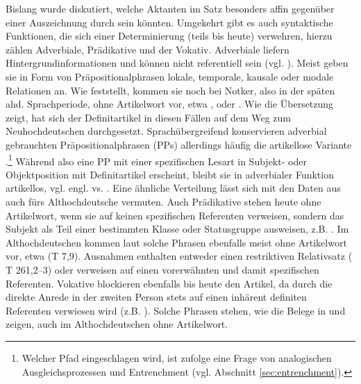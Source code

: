 Bislang wurde diskutiert, welche Aktanten im Satz besonders affin gegenüber einer Auszeichnung durch  sein könnten. Umgekehrt gibt es auch syntaktische Funktionen, die sich einer Determinierung (teils bis heute) verwehren, hierzu zählen Adverbiale, Prädikative und der Vokativ. Adverbiale liefern Hintergrundinformationen und können nicht referentiell sein (vgl. ). Meist geben sie in Form von Präpositionalphrasen lokale, temporale, kausale oder modale Relationen an. Wie \textcite[84]{Oubouzar1992} feststellt, kommen sie noch bei Notker, also in der späten ahd. Sprachperiode, ohne Artikelwort vor, etwa  ,   oder   \parencite[vgl. auch][76]{Szczepaniak2011a}. Wie die Übersetzung zeigt, hat sich der Definitartikel in diesen Fällen auf dem Weg zum Neuhochdeutschen durchgesetzt. Sprachübergreifend konservieren adverbial gebrauchten Präpositionalphrasen (PPs) allerdings häufig die artikellose Variante \parencite{Himmelmann1998}.\footnote{Welcher Pfad eingeschlagen wird, ist \textcite[342 und 344f.]{Himmelmann1998} zufolge eine Frage von analogischen Ausgleichsprozessen und Entrenchment (vgl. Abschnitt \ref{sec:entrenchment}).} Während also eine PP mit einer spezifischen Lesart in Subjekt- oder Objektposition mit Definitartikel erscheint, bleibt sie in adverbialer Funktion artikellos, vgl. engl.  vs.  \parencite[332]{Himmelmann1998}. Eine ähnliche Verteilung lässt sich mit den Daten aus \textcite[84f.]{Oubouzar1992} auch fürs Althochdeutsche vermuten. Auch Prädikative stehen heute ohne Artikelwort, wenn sie auf keinen spezifischen Referenten verweisen, sondern das Subjekt als Teil einer bestimmten Klasse oder Statusgruppe ausweisen, z.B.  \parencite[vgl.][218]{DAvis2013}. Im Althochdeutschen kommen laut \textcite[6--8]{Graf1905} solche Phrasen ebenfalls meist ohne Artikelwort vor, etwa  (T 7,9). Ausnahmen enthalten entweder einen restriktiven Relativsatz ( T 261,2--3) oder verweisen auf einen  vorerwähnten und damit spezifischen Referenten. Vokative blockieren ebenfalls bis heute den Artikel, da durch die direkte Anrede in der zweiten Person stets auf einen inhärent definiten Referenten verwiesen wird (z.B. ). Solche Phrasen stehen, wie die Belege in \textcite[13]{Graf1905} und \textcite[40]{Bell1907} zeigen, auch im Althochdeutschen ohne Artikelwort. 

